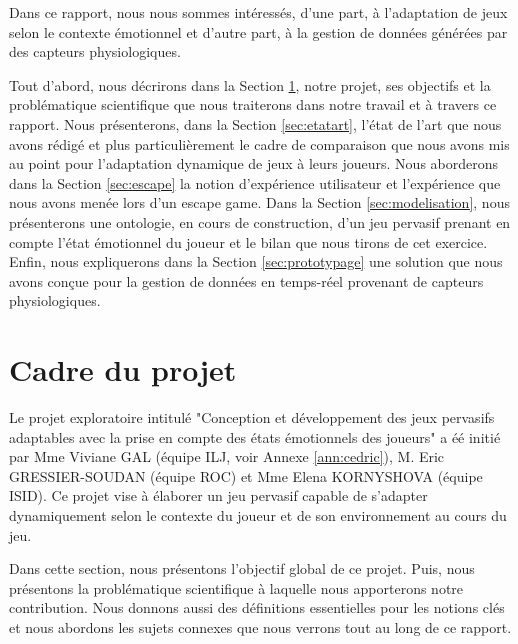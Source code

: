\documentclass[11pt]{article}
\begin{document}
	Dans ce rapport, nous nous sommes intéressés, d'une part, à l'adaptation de jeux selon le contexte émotionnel et d'autre part, à la gestion de données générées par des capteurs physiologiques.\par
	Tout d'abord, nous décrirons dans la Section \ref{sec:projet}, notre projet, ses objectifs et la problématique scientifique que nous traiterons dans notre travail et à travers ce rapport.
	Nous présenterons, dans la Section \ref{sec:etatart}, l'état de l'art que nous avons rédigé et plus particulièrement le cadre de comparaison que nous avons mis au point pour l'adaptation dynamique de jeux à leurs joueurs. 
	Nous aborderons dans la Section \ref{sec:escape} la notion d'expérience utilisateur et l'expérience que nous avons menée lors d'un escape game.
	Dans la Section \ref{sec:modelisation}, nous présenterons une ontologie, en cours de construction, d'un jeu pervasif prenant en compte l'état émotionnel du joueur et le bilan que nous tirons de cet exercice.
	Enfin, nous expliquerons dans la Section \ref{sec:prototypage} une solution que nous avons conçue pour la gestion de données en temps-réel provenant de capteurs physiologiques.

\section{Cadre du projet}\label{sec:projet}
	Le projet exploratoire intitulé "Conception et développement des jeux pervasifs adaptables avec la prise en compte des états émotionnels des joueurs" a éé initié par Mme Viviane GAL (équipe ILJ, voir Annexe \ref{ann:cedric}), M. Eric GRESSIER-SOUDAN (équipe ROC) et Mme Elena KORNYSHOVA (équipe ISID).
	Ce projet vise à élaborer un jeu pervasif capable de s'adapter dynamiquement selon le contexte du joueur et de son environnement au cours du jeu.\par
	Dans cette section, nous présentons l'objectif global de ce projet.
	Puis, nous présentons la problématique scientifique à laquelle nous apporterons notre contribution.
	Nous donnons aussi des définitions essentielles pour les notions clés et nous abordons les sujets connexes que nous verrons tout au long de ce rapport.
\end{document}
